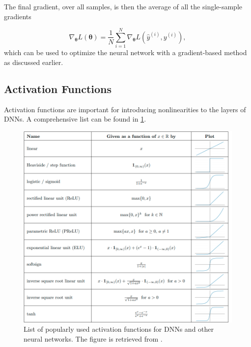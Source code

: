 The final gradient, over all samples, is then the average of all the single-sample gradients

\begin{equation}\label{eq:averageGradient}
    \nabla_{\boldsymbol{\theta}} L(\boldsymbol{\theta}) = \frac{1}{N}\sum_{i=1}^N \nabla_{\boldsymbol{\theta}} L(\hat{y}^{(i)}, y^{(i)}),
\end{equation}
which can be used to optimize the neural network with a gradient-based method as discussed earlier.

\subsection{Activation Functions}\label{sec:Activation Functions}

Activation functions are important for introducing nonlinearities to the layers of DNNs. A comprehensive list can be found in \cref{fig:activation function}.

\begin{figure}[H]
    \centering
    \includegraphics[width=12cm]{latex/figures/activations.png}
    \caption{List of popularly used activation functions for DNNs and other neural networks. The figure is retrieved from \citet{DBLP:journals/corr/abs-2105-04026}.}
    \label{fig:activation function}
\end{figure}

